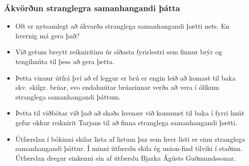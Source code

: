 \documentclass{beamer}
\begin{document}
\begin{frame}
\frametitle{Ákvörðun stranglegra samanhangandi þátta}

\begin{itemize}

\item<1-> Oft er nytsamlegt að ákvarða stranglega samanhangandi þætti nets. En hvernig má gera það?

\item<2-> Við getum breytt reikniritinu úr síðasta fyrirlestri sem finnur brýr og tengihnúta til þess að gera þetta.

\item<3-> Þetta vinnur útfrá því að ef leggur er brú er engin leið að komast til baka skv. skilgr. brúar, svo endahnútar brúarinnar verða að vera í ólíkum stranglega samanhangandi þáttum.

\item<4-> Þetta til viðbótar við það að skoða hvenær við komumst til baka í fyrri hnút gefur okkur reiknirit Tarjans til að finna stranglega samanhangandi þætti.

\item<5-> Útfærslan í bókinni skilar lista af listum þar sem hver listi er einn stranglega samanhangandi þáttur. Í minni útfærslu skila ég union-find tilviki í staðinn. Útfærslan dregur einkenni sín af útfærslu Bjarka Ágústs Guðmundssonar.

\end{itemize}

\end{frame}
\end{document}
